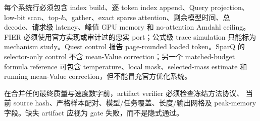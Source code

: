 每个系统行必须包含 index build、逐 token index append、Query projection、
low-bit scan、top-$k$、gather、exact sparse attention、剩余模型时间、总
decode、请求级 latency、峰值 GPU memory 和 no-attention Amdahl ceiling。
FIER 必须使用官方实现或审计过的忠实 port；公式级 trace simulation 只能标为
mechanism study。Quest control 报告 page-rounded loaded token。SparQ 的
selector-only control 不含 mean-Value correction；另一个 matched-budget
formula reference 可包含 temperature、local mask、selected-mass estimate
和 running mean-Value correction，但不能冒充官方优化系统。

在合并任何最终质量与速度数字前，artifact verifier 必须检查冻结方法协议、
当前 source hash、严格样本配对、模型/任务覆盖、长度/输出网格及 peak-memory
字段。缺失 artifact 应视为 gate 失败，而不是隐式通过。
